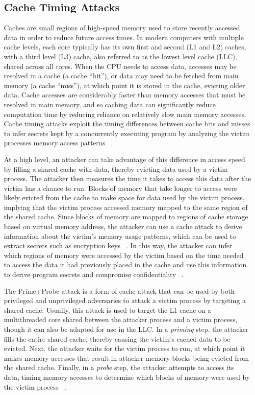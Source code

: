 \subsection{Cache Timing Attacks}

Caches are small regions of high-speed memory used to store recently accessed data in order to reduce future access times. In modern computers with multiple cache levels, each core typically has its own first and second (L1 and L2) caches, with a third level (L3) cache, also referred to as the lowest level cache (LLC), shared across all cores. When the CPU needs to access data, accesses may be resolved in a cache (a cache ``hit''), or data may need to be fetched from main memory (a cache ``miss''), at which point it is stored in the cache, evicting older data. Cache accesses are considerably faster than memory accesses that must be resolved in main memory, and so caching data can significantly reduce computation time by reducing reliance on relatively slow main memory accesses. Cache timing attacks exploit the timing differences between cache hits and misses to infer secrets kept by a concurrently executing program by analyzing the victim processes memory access patterns ~\cite{costan_intel_2016, moghimi_cachezoom:_2017}.  

At a high level, an attacker can take advantage of this difference in access speed by filling a shared cache with data, thereby evicting data used by a victim process. The attacker then measures the time it takes to access this data after the victim has a chance to run. Blocks of memory that take longer to access were likely evicted from the cache to make space for data used by the victim process, implying that the victim process accessed memory mapped to the same region of the shared cache. Since blocks of memory are mapped to regions of cache storage based on virtual memory address, the attacker can use a cache attack to derive information about the victim's memory usage patterns, which can be used to extract secrets such as encryption keys ~\cite{liu_cache-timing_2013}. In this way, the attacker can infer which regions of memory were accessed by the victim based on the time needed to access the data it had previously placed in the cache and use this information to derive program secrets and compromise confidentiality ~\cite{moghimi_cachezoom:_2017, gotzfried_cache_2017}.

The Prime+Probe attack is a form of cache attack that can be used by both privileged and unprivileged adversaries to attack a victim process by targeting a shared cache. Usually, this attack is used to target the L1 cache on a multithreaded core shared between the attacker process and a victim process, though it can also be adapted for use in the LLC. In a \emph{priming} step, the attacker fills the entire shared cache, thereby causing the victim's cached data to be evicted. Next, the attacker waits for the victim process to run, at which point it makes memory accesses that result in attacker memory blocks being evicted from the shared cache. Finally, in a \emph{probe} step, the attacker attempts to access its data, timing memory accesses to determine which blocks of memory were used by the victim process ~\cite{moghimi_cachezoom:_2017, gotzfried_cache_2017}.

